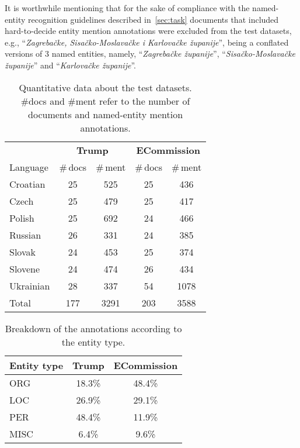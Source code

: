 \documentclass[11pt]{article}
\begin{document}
It is worthwhile mentioning that for the sake of compliance with the named-entity recognition guidelines described
in~\ref{sec:task} documents that included hard-to-decide entity mention annotations were excluded from the test 
datasets, e.g., ``\textit{Zagrebačke, Sisačko-Moslavačke i Karlovačke županije}'', being a conflated versions of 3 
named entities, namely, ``\textit{Zagrebačke županije}'', ``\textit{Sisačko-Moslavačke županije}'' and ``\textit{Karlovačke županije}''.

\begin{table}
\begin{center}
\begin{footnotesize}
\begin{tabular}{lcccc}
\toprule 
 & \multicolumn{2}{c}{\textbf{{\sc Trump}}} & \multicolumn{2}{c}{\textbf{{\sc ECommission}}} \\
\cmidrule(lr){2-3}
\cmidrule(lr){4-5}
Language &  \#\,docs & \#\,ment & \#\,docs & \#\,ment \\
\midrule
Croatian & 25 & 525 & 25 & 436 \\
Czech & 25 & 479  & 25 & 417 \\
Polish & 25 & 692  & 24 & 466 \\
Russian & 26 & 331  & 24 & 385 \\
Slovak  & 24 & 453  & 25 & 374 \\
Slovene & 24 & 474  & 26 & 434 \\
Ukrainian & 28 & 337  & 54 & 1078 \\
\midrule
Total & 177 & 3291  & 203 & 3588 \\


\bottomrule
\end{tabular}
\end{footnotesize}
\end{center}
\caption{Quantitative data about the test datasets. \#docs and \#ment refer to the number of documents and named-entity mention annotations.}
\label{tab:datasets}
\end{table}

\begin{table}
\begin{center}
\begin{footnotesize}
\begin{tabular}{lcc}
\toprule 
 Entity type & {\textbf{{\sc Trump}}} & {\textbf{{\sc ECommission}}} \\
\midrule
ORG & 18.3\% & 48.4\% \\
LOC & 26.9\% & 29.1\% \\
PER & 48.4\% & 11.9\% \\
MISC & 6.4\% & 9.6\% \\
\bottomrule
\end{tabular}
\end{footnotesize}
\end{center}
\caption{Breakdown of the annotations according to the entity type.}
\label{tab:datasets-2}
\end{table}
\end{document}

